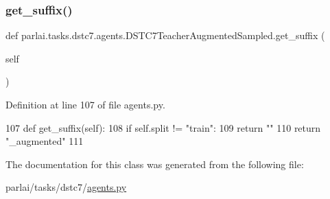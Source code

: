 \subsubsection{\texorpdfstring{get\+\_\+suffix()}{get\_suffix()}}
{\footnotesize\ttfamily def parlai.\+tasks.\+dstc7.\+agents.\+D\+S\+T\+C7\+Teacher\+Augmented\+Sampled.\+get\+\_\+suffix (\begin{DoxyParamCaption}\item[{}]{self }\end{DoxyParamCaption})}



Definition at line 107 of file agents.\+py.


\begin{DoxyCode}
107     \textcolor{keyword}{def }get\_suffix(self):
108         \textcolor{keywordflow}{if} self.split != \textcolor{stringliteral}{"train"}:
109             \textcolor{keywordflow}{return} \textcolor{stringliteral}{""}
110         \textcolor{keywordflow}{return} \textcolor{stringliteral}{"\_augmented"}
111 
\end{DoxyCode}


The documentation for this class was generated from the following file\+:\begin{DoxyCompactItemize}
\item 
parlai/tasks/dstc7/\hyperlink{parlai_2tasks_2dstc7_2agents_8py}{agents.\+py}\end{DoxyCompactItemize}
